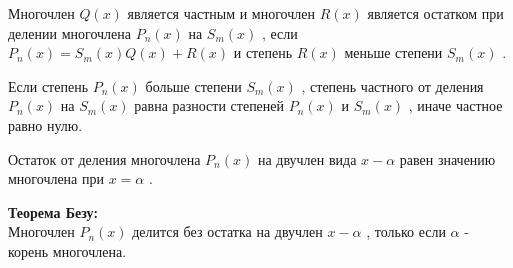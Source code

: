 \documentclass[oneside]{book}
\begin{document}
	Многочлен
	\begin{math}
		Q(x)
	\end{math}
	является частным и многочлен
	\begin{math}
		R(x)
	\end{math}
	является остатком при делении многочлена 
	\begin{math}
		P_n(x)
	\end{math}
	на 
	\begin{math}
		S_m(x)
	\end{math}
	, если
	\begin{math}
		P_n(x) = S_m(x)Q(x) + R(x)
	\end{math}
	и степень
	\begin{math}
		R(x)
	\end{math}
	меньше степени
	\begin{math}
		S_m(x)
	\end{math}
	.

	Если
	степень
	\begin{math}
		P_n(x)
	\end{math}
	больше степени
	\begin{math}
		S_m(x)
	\end{math}
	, степень частного от деления
	\begin{math}
		P_n(x)
	\end{math}
	на
	\begin{math}
		S_m(x)
	\end{math}
	равна разности степеней
	\begin{math}
		P_n(x)
	\end{math}
	и
	\begin{math}
		S_m(x)
	\end{math}
	, иначе частное равно нулю.

	Остаток от деления многочлена
	\begin{math}
		P_n(x)
	\end{math}
	на двучлен вида
	\begin{math}
		x - \alpha 
	\end{math}
	равен значению многочлена при
	\begin{math}
		x = \alpha 
	\end{math}
	.

	\textbf{Теорема Безу:}
	\\
	Многочлен
	\begin{math}
		P_n(x)
	\end{math}
	делится без остатка на двучлен
	\begin{math}
		x - \alpha
	\end{math}
	, только если
	\begin{math}
		\alpha 
	\end{math}
	- корень многочлена.
\end{document}
